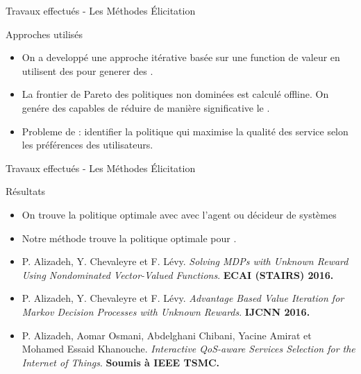 \documentclass{beamer}
\newcommand{\imp}[1]{{\color{red}{#1}}}
\begin{document}
{{\begin{frame}{Travaux effectués - Les Méthodes Élicitation}
\begin{block}{Approches utilisés}
\begin{itemize}
\item On a developpé une approche itérative basée sur une function de valeur en utilisent des \imp{méthodes de clustering} pour generer des \imp{requ\^etes plus informatives}.
\item La frontier de Pareto des politiques non dominées est calculé offline. On genére des \imp{coupes}capables de réduire de manière significative le \imp{polytope des recompenses}.
\item Probleme de \imp{composition de \textit{web-service}}: identifier la politique qui maximise la qualité des service selon les préférences des utilisateurs.
\end{itemize}
\end{block}

\end{frame}







\begin{frame}{Travaux effectués - Les Méthodes Élicitation}

\begin{block}{Résultats}
\begin{itemize}
\item On trouve la politique optimale avec \imp{$65 \% $  moins de communications }avec l’agent ou décideur de
systèmes
\item Notre méthode trouve la politique optimale  pour \imp{instances réeles de grande taille}.
\end{itemize}
\end{block}

\begin{itemize}
\small
\item P. Alizadeh, Y. Chevaleyre et F. Lévy. \textit{Solving MDPs with Unknown Reward Using Nondominated Vector-Valued Functions}. \textbf{ECAI (STAIRS) 2016.}
\item P. Alizadeh, Y. Chevaleyre et F. Lévy. \textit{Advantage Based Value Iteration for Markov Decision Processes with Unknown Rewards}. \textbf{IJCNN 2016.}
\item P. Alizadeh, Aomar Osmani, Abdelghani Chibani, Yacine Amirat et Mohamed Essaid Khanouche. \textit{Interactive QoS-aware Services Selection for the Internet of Things}. \textbf{Soumis à IEEE TSMC.}
\end{itemize}



\end{frame}}}
\end{document}
